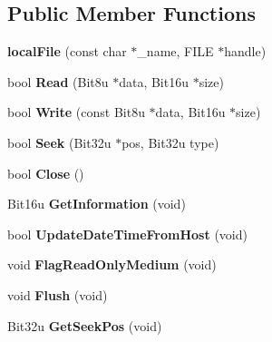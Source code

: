 \subsection*{Public Member Functions}
\begin{DoxyCompactItemize}
\item 
\hypertarget{classlocalFile_a9860da86cc7c2122c78ad8ea65fcec5d}{{\bfseries local\-File} (const char $\ast$\-\_\-name, F\-I\-L\-E $\ast$handle)}\label{classlocalFile_a9860da86cc7c2122c78ad8ea65fcec5d}

\item 
\hypertarget{classlocalFile_a558f7d758b8818237b26722c466f0f49}{bool {\bfseries Read} (Bit8u $\ast$data, Bit16u $\ast$size)}\label{classlocalFile_a558f7d758b8818237b26722c466f0f49}

\item 
\hypertarget{classlocalFile_a692068e0eb68eaa11661f2246270af1c}{bool {\bfseries Write} (const Bit8u $\ast$data, Bit16u $\ast$size)}\label{classlocalFile_a692068e0eb68eaa11661f2246270af1c}

\item 
\hypertarget{classlocalFile_ab661b8383ca8cf945056571ca982912a}{bool {\bfseries Seek} (Bit32u $\ast$pos, Bit32u type)}\label{classlocalFile_ab661b8383ca8cf945056571ca982912a}

\item 
\hypertarget{classlocalFile_a29a72ec4be5c9f3b0196f2f4d47f5f54}{bool {\bfseries Close} ()}\label{classlocalFile_a29a72ec4be5c9f3b0196f2f4d47f5f54}

\item 
\hypertarget{classlocalFile_a970064b86d4966929fae874542104cba}{Bit16u {\bfseries Get\-Information} (void)}\label{classlocalFile_a970064b86d4966929fae874542104cba}

\item 
\hypertarget{classlocalFile_a6ddb9040bcee2bfb3673228b47042e89}{bool {\bfseries Update\-Date\-Time\-From\-Host} (void)}\label{classlocalFile_a6ddb9040bcee2bfb3673228b47042e89}

\item 
\hypertarget{classlocalFile_a48ed18aa11972f7236cc34928387ff32}{void {\bfseries Flag\-Read\-Only\-Medium} (void)}\label{classlocalFile_a48ed18aa11972f7236cc34928387ff32}

\item 
\hypertarget{classlocalFile_a6fc67afa9e37a05b353d4376a714d495}{void {\bfseries Flush} (void)}\label{classlocalFile_a6fc67afa9e37a05b353d4376a714d495}

\item 
\hypertarget{classlocalFile_ac0b74c929048947e12d164a0430d32e2}{Bit32u {\bfseries Get\-Seek\-Pos} (void)}\label{classlocalFile_ac0b74c929048947e12d164a0430d32e2}

\end{DoxyCompactItemize}
